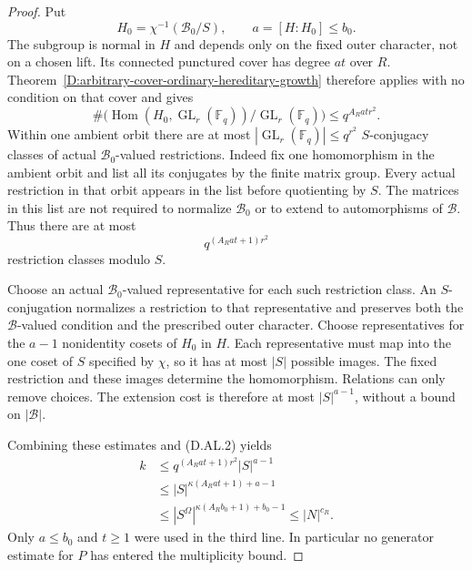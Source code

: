 \begin{proof}
Put
\[
 H_0=\chi^{-1}(\mathcal B_0/S),\qquad a=[H:H_0]\le b_0.
                                                        \tag{D.AL.8}
\]
The subgroup is normal in $H$ and depends only on the
fixed outer character, not on a chosen lift. Its
connected punctured cover has degree $at$ over $R$.
Theorem~\ref{D:arbitrary-cover-ordinary-hereditary-growth}
therefore applies with no condition on that cover and gives
\[
 \#\bigl(\operatorname{Hom}(H_0,\operatorname{GL}_r(\mathbb F_q))
              /\operatorname{GL}_r(\mathbb F_q)\bigr)
                                      \le q^{A_Rat r^2}.
                                                        \tag{D.AL.9}
\]
Within one ambient orbit there are at most
$|\operatorname{GL}_r(\mathbb F_q)|\le q^{r^2}$
$S$-conjugacy classes of actual $\mathcal B_0$-valued
restrictions. Indeed fix one homomorphism in the ambient
orbit and list all its conjugates by the finite matrix
group. Every actual restriction in that orbit appears
in the list before quotienting by $S$. The matrices in
this list are not required to normalize $\mathcal B_0$
or to extend to automorphisms of $\mathcal B$.
Thus there are at most
\[
                         q^{(A_Rat+1)r^2}              \tag{D.AL.10}
\]
restriction classes modulo $S$.

Choose an actual $\mathcal B_0$-valued representative
for each such restriction class. An $S$-conjugation
normalizes a restriction to that representative and
preserves both the $\mathcal B$-valued condition and
the prescribed outer character. Choose representatives
for the $a-1$ nonidentity cosets of $H_0$ in $H$.
Each representative must map into the one coset of $S$
specified by $\chi$, so it has at most $|S|$ possible
images. The fixed restriction and these images determine
the homomorphism. Relations can only remove choices.
The extension cost is therefore at most $|S|^{a-1}$,
without a bound on $|\mathcal B|$.

Combining these estimates and (D.AL.2) yields
\[
 \begin{split}
 k&\le q^{(A_Rat+1)r^2}|S|^{a-1}\\
  &\le |S|^{\kappa(A_Rat+1)+a-1}\\
  &\le |S^\Omega|^{\kappa(A_Rb_0+1)+b_0-1}
   \le |N|^{c_R}.
 \end{split}                                            \tag{D.AL.11}
\]
Only $a\le b_0$ and $t\ge1$ were used in the third
line. In particular no generator estimate for $P$ has
entered the multiplicity bound.


\end{proof}
